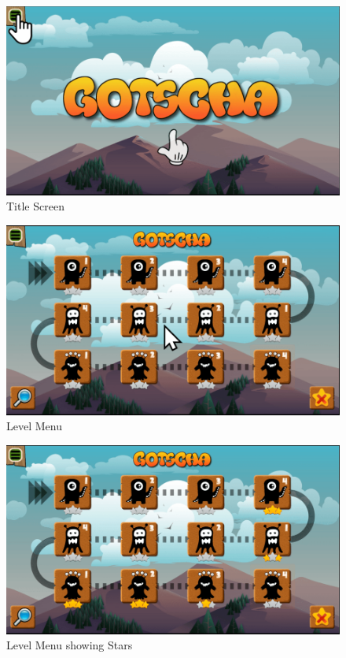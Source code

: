 \begin{figure}[H]
    \centering
    \includegraphics[width=1\textwidth]{figures/welcomescreen}
    \caption{Title Screen}
    \label{fig:titlescreen}
\end{figure}

\begin{figure}[H]
    \centering
    \includegraphics[width=1\textwidth]{figures/levelmenu}
    \caption{Level Menu}
    \label{fig:levelmenu}
\end{figure}

\begin{figure}[H]
    \centering
    \includegraphics[width=1\textwidth]{figures/levelmenustars}
    \caption{Level Menu showing Stars}
    \label{fig:levelmenustars}
\end{figure}

